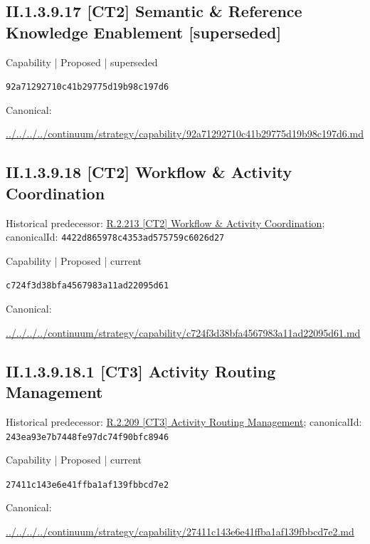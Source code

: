 \documentclass[10pt,a4paper]{article}
\begin{document}
\subsection*{II.1.3.9.17 [CT2] Semantic \& Reference Knowledge Enablement [superseded]}
\label{element-92a71292710c41b29775d19b98c197d6}
{\small Capability | Proposed | superseded}\par
\texttt{92a71292710c41b29775d19b98c197d6}\par
Canonical: \par
{\footnotesize\url{../../../../continuum/strategy/capability/92a71292710c41b29775d19b98c197d6.md}}\par
\subsection*{II.1.3.9.18 [CT2] Workflow \& Activity Coordination}
Historical predecessor: \hyperref[element-4422d865978c4353ad575759c6026d27]{R.2.213 [CT2] Workflow \& Activity Coordination}; canonicalId: \texttt{4422d865978c4353ad575759c6026d27}\par
\label{element-c724f3d38bfa4567983a11ad22095d61}
{\small Capability | Proposed | current}\par
\texttt{c724f3d38bfa4567983a11ad22095d61}\par
Canonical: \par
{\footnotesize\url{../../../../continuum/strategy/capability/c724f3d38bfa4567983a11ad22095d61.md}}\par
\subsection*{II.1.3.9.18.1 [CT3] Activity Routing Management}
Historical predecessor: \hyperref[element-243ea93e7b7448fe97dc74f90bfc8946]{R.2.209 [CT3] Activity Routing Management}; canonicalId: \texttt{243ea93e7b7448fe97dc74f90bfc8946}\par
\label{element-27411c143e6e41ffba1af139fbbcd7e2}
{\small Capability | Proposed | current}\par
\texttt{27411c143e6e41ffba1af139fbbcd7e2}\par
Canonical: \par
{\footnotesize\url{../../../../continuum/strategy/capability/27411c143e6e41ffba1af139fbbcd7e2.md}}\par
\end{document}

